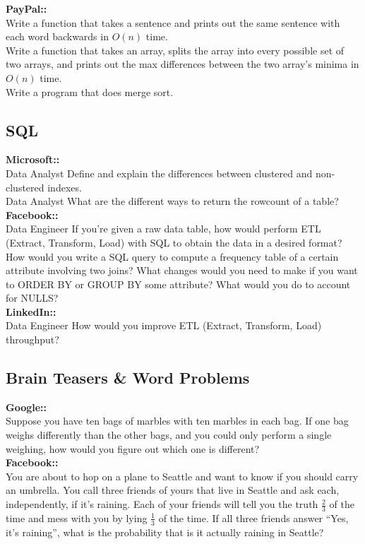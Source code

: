 \documentclass[11pt]{article}
\begin{document}
{\bf PayPal:: }\\
Write a function that takes a sentence and prints out the same sentence with each word backwards in $O(n)$ time.\\
Write a function that takes an array, splits the array into every possible set of two arrays, and prints out the max differences between the two array’s minima in $O(n)$ time.\\
Write a program that does merge sort.\\


\subsection{SQL} 
{\bf Microsoft:: }\\
Data Analyst Define and explain the differences between clustered and non-clustered indexes. \\
Data Analyst What are the different ways to return the rowcount of a table?\\

{\bf Facebook:: }\\
Data Engineer If you’re given a raw data table, how would perform ETL (Extract, Transform, Load) with SQL to obtain the data in a desired format?\\
How would you write a SQL query to compute a frequency table of a certain attribute involving two joins? What changes would you need to make if you want to ORDER BY or GROUP BY some attribute? What would you do to account for NULLS? \\

{\bf LinkedIn:: }\\
Data Engineer How would you improve ETL (Extract, Transform, Load) throughput?\\


\subsection{Brain Teasers \& Word Problems}
{\bf Google:: }\\
Suppose you have ten bags of marbles with ten marbles in each bag. If one bag weighs differently than the other bags, and you could only perform a single weighing, how would you figure out which one is different?\\

{\bf Facebook:: }\\
You are about to hop on a plane to Seattle and want to know if you should carry an umbrella. You call three friends of yours that live in Seattle and ask each, independently, if it’s raining. Each of your friends will tell you the truth $\frac{2}{3}$ of the time and mess with you by lying $\frac{1}{3}$ of the time. If all three friends answer ``Yes, it’s raining'', what is the probability that is it actually raining in Seattle?\\
\end{document}
